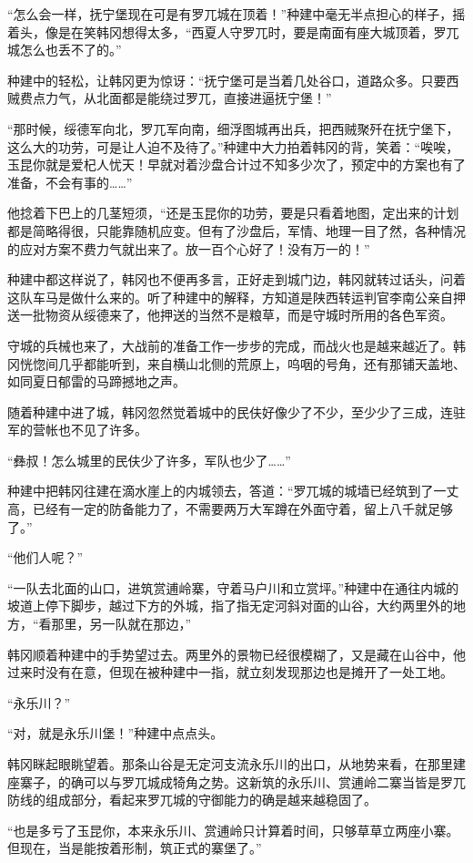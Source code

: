 “怎么会一样，抚宁堡现在可是有罗兀城在顶着！”种建中毫无半点担心的样子，摇着头，像是在笑韩冈想得太多，“西夏人守罗兀时，要是南面有座大城顶着，罗兀城怎么也丢不了的。”

种建中的轻松，让韩冈更为惊讶：“抚宁堡可是当着几处谷口，道路众多。只要西贼费点力气，从北面都是能绕过罗兀，直接进逼抚宁堡！”

“那时候，绥德军向北，罗兀军向南，细浮图城再出兵，把西贼聚歼在抚宁堡下，这么大的功劳，可是让人迫不及待了。”种建中大力拍着韩冈的背，笑着：“唉唉，玉昆你就是爱杞人忧天！早就对着沙盘合计过不知多少次了，预定中的方案也有了准备，不会有事的……”

他捻着下巴上的几茎短须，“还是玉昆你的功劳，要是只看着地图，定出来的计划都是简略得很，只能靠随机应变。但有了沙盘后，军情、地理一目了然，各种情况的应对方案不费力气就出来了。放一百个心好了！没有万一的！”

种建中都这样说了，韩冈也不便再多言，正好走到城门边，韩冈就转过话头，问着这队车马是做什么来的。听了种建中的解释，方知道是陕西转运判官李南公亲自押送一批物资从绥德来了，他押送的当然不是粮草，而是守城时所用的各色军资。

守城的兵械也来了，大战前的准备工作一步步的完成，而战火也是越来越近了。韩冈恍惚间几乎都能听到，来自横山北侧的荒原上，呜咽的号角，还有那铺天盖地、如同夏日郁雷的马蹄撼地之声。

随着种建中进了城，韩冈忽然觉着城中的民伕好像少了不少，至少少了三成，连驻军的营帐也不见了许多。

“彝叔！怎么城里的民伕少了许多，军队也少了……”

种建中把韩冈往建在滴水崖上的内城领去，答道：“罗兀城的城墙已经筑到了一丈高，已经有一定的防备能力了，不需要两万大军蹲在外面守着，留上八千就足够了。”

“他们人呢？”

“一队去北面的山口，进筑赏逋岭寨，守着马户川和立赏坪。”种建中在通往内城的坡道上停下脚步，越过下方的外城，指了指无定河斜对面的山谷，大约两里外的地方，“看那里，另一队就在那边，”

韩冈顺着种建中的手势望过去。两里外的景物已经很模糊了，又是藏在山谷中，他过来时没有在意，但现在被种建中一指，就立刻发现那边也是摊开了一处工地。

“永乐川？”

“对，就是永乐川堡！”种建中点点头。

韩冈眯起眼眺望着。那条山谷是无定河支流永乐川的出口，从地势来看，在那里建座寨子，的确可以与罗兀城成犄角之势。这新筑的永乐川、赏逋岭二寨当皆是罗兀防线的组成部分，看起来罗兀城的守御能力的确是越来越稳固了。

“也是多亏了玉昆你，本来永乐川、赏逋岭只计算着时间，只够草草立两座小寨。但现在，当是能按着形制，筑正式的寨堡了。”

